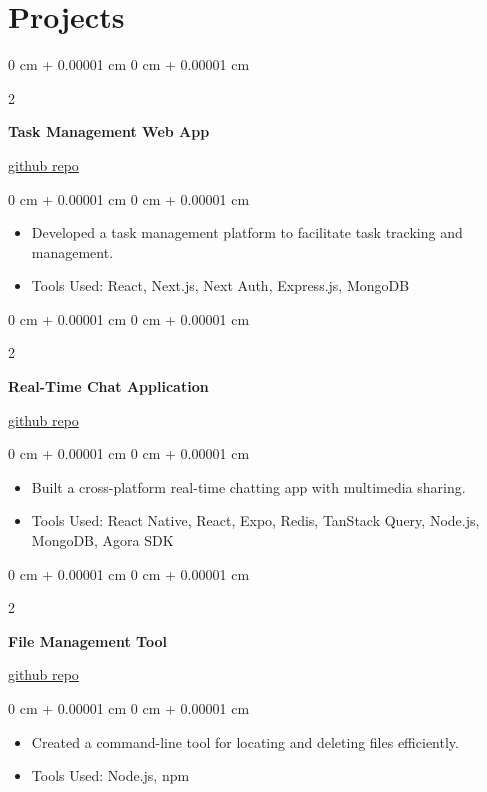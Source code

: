 \documentclass[10pt, letterpaper]{article}
\newenvironment{highlights}{
    \begin{itemize}[
        topsep=0.10 cm,
        parsep=0.10 cm,
        partopsep=0pt,
        itemsep=0pt,
        leftmargin=0 cm + 10pt
    ]
}{
    \end{itemize}
} %
\newenvironment{onecolentry}{
    \begin{adjustwidth}{
        0 cm + 0.00001 cm
    }{
        0 cm + 0.00001 cm
    }
}{
    \end{adjustwidth}
} %
\newenvironment{twocolentry}[2][]{
    \onecolentry
    \def\secondColumn{#2}
    \setcolumnwidth{\fill, 4.5 cm}
    \begin{paracol}{2}
}{
    \switchcolumn \raggedleft \secondColumn
    \end{paracol}
    \endonecolentry
} %
\begin{document}
\section{Projects}

\begin{twocolentry}{\href{https://github.com/murvyn/taskify}{github repo}}
    \textbf{Task Management Web App}
\end{twocolentry}
\vspace{0.10 cm}
\begin{onecolentry}
    \begin{highlights}
        \item Developed a task management platform to facilitate task tracking and
        management.
        \item Tools Used: React, Next.js, Next Auth, Express.js, MongoDB
    \end{highlights}
\end{onecolentry}

\vspace{0.2 cm}

\begin{twocolentry}{\href{https://github.com/murvyn/chat-forum}{github repo}}
    \textbf{Real-Time Chat Application}
\end{twocolentry}
\vspace{0.10 cm}
\begin{onecolentry}
    \begin{highlights}
        \item Built a cross-platform real-time chatting app with multimedia sharing.
        \item Tools Used: React Native, React, Expo, Redis, TanStack Query, Node.js, MongoDB,
        Agora SDK
    \end{highlights}
\end{onecolentry}

\vspace{0.2 cm}

\begin{twocolentry}{\href{https://github.com/murvyn/delete-file-cli}{github repo}}
    \textbf{File Management Tool}
\end{twocolentry}
\vspace{0.10 cm}
\begin{onecolentry}
    \begin{highlights}
        \item Created a command-line tool for locating and deleting files efficiently.
        \item Tools Used: Node.js, npm
    \end{highlights}
\end{onecolentry}
\end{document}
